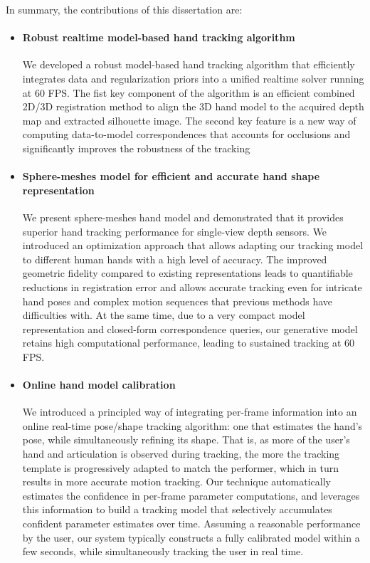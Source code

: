 In summary, the contributions of this dissertation are:
\begin{itemize}

\item \paragraph{Robust realtime model-based hand tracking algorithm}
We developed a robust model-based hand tracking algorithm that efficiently integrates data and regularization priors into a unified realtime solver running at 60 FPS. The fist key component of the algorithm is an efficient combined 2D/3D registration method to align the 3D hand model to the acquired depth map and extracted silhouette image. The second key feature is a new way of computing data-to-model correspondences that accounts for occlusions and significantly improves the robustness of the tracking

\item \paragraph{Sphere-meshes model for efficient and accurate hand shape representation}
We present sphere-meshes hand model and demonstrated that it provides superior hand tracking performance for single-view depth sensors. We introduced an optimization approach that allows adapting our tracking model to different human hands with a high level of accuracy. The improved geometric fidelity compared to existing representations leads to quantifiable reductions in registration error and allows accurate tracking even for intricate hand poses and complex motion sequences that previous methods have difficulties with. At the same time, due to a very compact model representation and closed-form correspondence queries, our generative model retains high computational performance, leading to sustained tracking at 60 FPS.

\item \paragraph{Online hand model calibration} 
We introduced a principled way of integrating per-frame information into an online real-time pose/shape tracking algorithm: one that estimates the hand’s pose, while simultaneously refining its shape. That is, as more of the user’s hand and articulation is observed during tracking, the more the tracking template is progressively adapted to match the performer, which in turn results in more accurate motion tracking. Our technique automatically estimates the confidence in per-frame parameter computations, and leverages this information to build a tracking model that selectively accumulates confident parameter estimates over time. Assuming a reasonable performance by the user, our system typically constructs a fully calibrated model within a few seconds, while simultaneously tracking the user in real time. 


\end{itemize}
